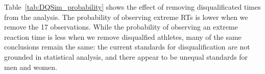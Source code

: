\documentclass[12pt, letterpaper]{article}
\begin{document}
Table~\ref{tab:DQSim_probability} shows the effect of removing disqualificated
times from the analysis.  The probability of observing extreme RTs is lower when
we remove the 17 observations.  While the probability of observing an extreme
reaction time is less when we remove disqualfied athletes, many of the same
conclusions remain the same: the current standards for disqualification are not
grounded in statistical analysis, and there appear to be unequal standards for men
and women.



\end{document}
